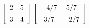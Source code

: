 {$\left[ \begin {array}{cc} 2&5\\\noalign{\medskip}3&4\end {array}
 \right] $
 }
{$\left[ \begin {array}{cc} -4/7&5/7\\\noalign{\medskip}3/7&-2/7\end {array}
 \right]$ }
